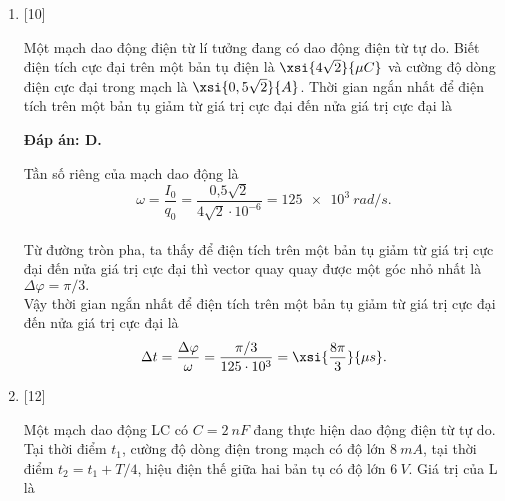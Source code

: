 \begin{enumerate}[label=\bfseries Câu \arabic*:]
{	}
	
	\item {} [10]
	
	\cauhoi
	{Một mạch dao động điện từ lí tưởng đang có dao động điện từ tự do. Biết điện tích cực đại trên một bản tụ điện là $\xsi{4\sqrt{2}}{\mu C}$ và cường độ dòng điện cực đại trong mạch là $\xsi{0,5\sqrt{2}}{A}$. Thời gian ngắn nhất để điện tích trên một bản tụ giảm từ giá trị cực đại đến nửa giá trị cực đại là
	}
	
	\loigiai
	{		\textbf{Đáp án: D.}
		
		Tần số riêng của mạch dao động là 
		$$
		\omega = \dfrac{I_0}{q_0} = \dfrac{\text{0,5} \sqrt{2}}{4 \sqrt{2} \cdot10^{-6}} = \SI{125 e3}{rad/s}.
		$$ \\
		Từ đường tròn pha, ta thấy để điện tích trên một bản tụ giảm từ giá trị cực đại đến nửa giá trị cực đại thì vector quay quay được một góc nhỏ nhất là $\Delta \varphi = \pi /3.$ \\
		Vậy thời gian ngắn nhất để điện tích trên một bản tụ giảm từ giá trị cực đại đến nửa giá trị cực đại là
		$$
		\Delta t = \dfrac{\Delta \varphi}{\omega} = \dfrac{\pi / 3}{125\cdot10^{3}} = \xsi{\dfrac{8\pi}{3}}{\mu s}.
		$$
	}



	\item {} [12]
	
	\cauhoi
	{Một mạch dao động LC có $C = \SI{2}{nF}$ đang thực hiện dao động điện từ tự do. Tại thời điểm $t_1$, cường độ dòng điện trong mạch có độ lớn $\SI{8}{mA}$, tại thời điểm $t_2 = t_1 +T/4$, hiệu điện thế giữa hai bản tụ có độ lớn $\SI{6}{V}$. Giá trị của L là 
	}
	

\end{enumerate}
